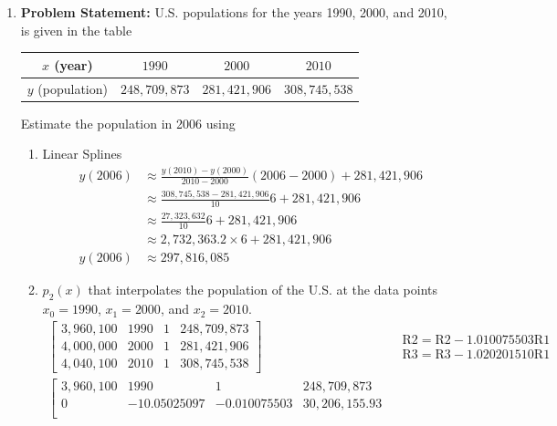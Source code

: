 \documentclass[12pt,twoside]{amsart}
\begin{document}
\begin{enumerate}
    \item\textbf{Problem Statement:} U.S. populations for the years 1990, 2000, and 2010, is given in the table
    \begin{center}
    \begin{tabular}{|c||c|c|c|}
        \hline
        $x$ (year) & $1990$ & $2000$ & $2010$ \\
        \hline
        $y$ (population) & $248,709,873$ & $281,421,906$ & $308,745,538$ \\
        \hline
    \end{tabular}
    \end{center}
    Estimate the population in 2006 using
    \begin{enumerate}
        \item Linear Splines
        \begin{align*}
            y(2006) & \approx \frac{y(2010) - y(2000)}{2010 - 2000}(2006 - 2000) + 281,421,906 \\
            & \approx \frac{308,745,538 - 281,421,906}{10}6 + 281,421,906 \\
            & \approx \frac{27,323,632}{10}6 + 281,421,906 \\
            & \approx 2,732,363.2 \times 6 + 281,421,906 \\
            y(2006) & \approx 297,816,085
        \end{align*}
        \item $p_2(x)$ that interpolates the population of the U.S. at the data points $x_0 = 1990$, $x_1 = 2000$, and $x_2 = 2010$.
        \begin{align*}
            \left[\begin{array}{ccc|c}
                3,960,100 & 1990 & 1 & 248,709,873 \\
                4,000,000 & 2000 & 1 & 281,421,906\\
                4,040,100 & 2010 & 1 & 308,745,538
            \end{array}\right] & \begin{array}{c}\text{R2} = \text{R2} - 1.010075503\text{R1} \\ \text{R3} = \text{R3} - 1.020201510\text{R1}\end{array} \\
            \left[\begin{array}{ccc|c}
                3,960,100 & 1990 & 1 & 248,709,873 \\
                0 & -10.05025097 & -0.010075503 & 30,206,155.93 \\

\end{array}
\end{align*}
\end{enumerate}
\end{enumerate}
\end{document}
